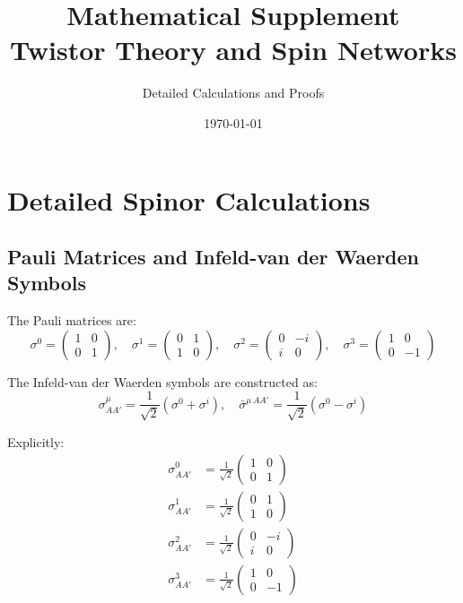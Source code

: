 \documentclass[12pt,a4paper]{article}
\title{\textbf{Mathematical Supplement}\\
\Large Twistor Theory and Spin Networks}
\author{Detailed Calculations and Proofs}
\date{\today}
\theoremstyle{definition}
\begin{document}
\maketitle
\tableofcontents
\newpage

\section{Detailed Spinor Calculations}

\subsection{Pauli Matrices and Infeld-van der Waerden Symbols}

The Pauli matrices are:
\begin{equation}
\sigma^0 = \begin{pmatrix} 1 & 0 \\ 0 & 1 \end{pmatrix}, \quad
\sigma^1 = \begin{pmatrix} 0 & 1 \\ 1 & 0 \end{pmatrix}, \quad
\sigma^2 = \begin{pmatrix} 0 & -i \\ i & 0 \end{pmatrix}, \quad
\sigma^3 = \begin{pmatrix} 1 & 0 \\ 0 & -1 \end{pmatrix}
\end{equation}

The Infeld-van der Waerden symbols are constructed as:
\begin{equation}
\sigma^\mu_{AA'} = \frac{1}{\sqrt{2}}(\sigma^0 + \sigma^i), \quad
\bar{\sigma}^{\mu\, AA'} = \frac{1}{\sqrt{2}}(\sigma^0 - \sigma^i)
\end{equation}

Explicitly:
\begin{align}
\sigma^0_{AA'} &= \frac{1}{\sqrt{2}}\begin{pmatrix} 1 & 0 \\ 0 & 1 \end{pmatrix} \\
\sigma^1_{AA'} &= \frac{1}{\sqrt{2}}\begin{pmatrix} 0 & 1 \\ 1 & 0 \end{pmatrix} \\
\sigma^2_{AA'} &= \frac{1}{\sqrt{2}}\begin{pmatrix} 0 & -i \\ i & 0 \end{pmatrix} \\
\sigma^3_{AA'} &= \frac{1}{\sqrt{2}}\begin{pmatrix} 1 & 0 \\ 0 & -1 \end{pmatrix}
\end{align}
\end{document}
